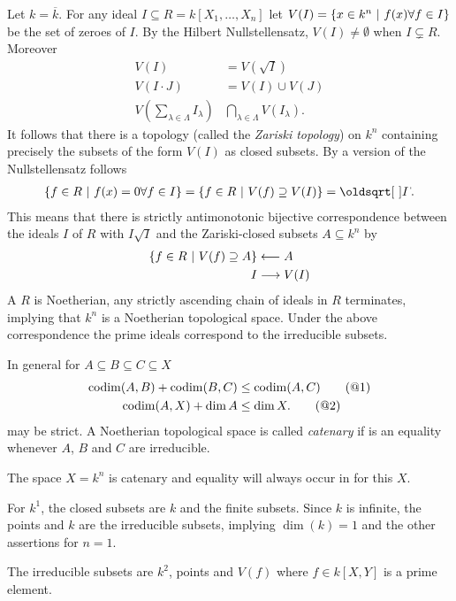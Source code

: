 \documentclass[a4paper,parskip=full,numbers=enddot]{scrreprt}
\begin{document}
\begin{example}
  Let $k =\overline{k}$. For any ideal $I\subseteq R = k[X_1,\ldots,X_n]$ let $V(I) = \left\{x\in k^n\ \middle|\  f(x) \forall f\in I\right\}$ be the set of zeroes of $I$. By the Hilbert Nullstellensatz, $V(I) \neq \emptyset$ when $I\subsetneq R$. Moreover 
  \begin{align*}
    V(I)& = V(\sqrt{I})\\
    V(I\cdot J ) &= V(I) \cup V(J)\\
    V\left(\sum_{\lambda\in\Lambda} I_\lambda\right) &\bigcap_{\lambda\in\Lambda} V(I_\lambda).
 \end{align*}
 It follows that there is a topology (called the \emph{Zariski topology}) on $k^n$ containing precisely the subsets of the form $V(I)$ as closed subsets. By a version of the Nullstellensatz follows
 \begin{align*}
  \left\{f\in R\st f(x) = 0\forall f\in I\right\} = \left\{f\in R\st V(f)\supseteq V(I)\right\} = \sqrt{I}.
 \end{align*}
 This means that there is strictly antimonotonic bijective correspondence between the ideals $I$ of $R$ with $I\sqrt{I}$ and the Zariski-closed subsets $A\subseteq k^n$ by
 \begin{align*}
    \left\{f\in R\ \middle|\  V(f)\supseteq A\right\} &\longleftarrow A\\
    I&\longrightarrow V(I)
 \end{align*}
 A $R$ is Noetherian, any strictly ascending chain of ideals in $R$ terminates, implying that $k^n$ is a Noetherian topological space. Under the above correspondence the prime ideals correspond to the irreducible subsets.  
\end{example}
\begin{rem}
 In general for $A\subseteq B\subseteq C\subseteq X$
 \begin{align*}\lbl{eq:codimIneq}
    \codim(A,B) +\codim(B,C) &\leq \codim(A,C) \tag{@1}\\ 
    \codim(A,X)+\dim A &\leq \dim X.\lbl{eq:codimIneq2}\tag{@2}
 \end{align*}
 may be strict. A Noetherian topological space is called \emph{catenary} if  is an equality whenever $A$, $B$ and $C$ are irreducible.

\end{rem}
\begin{thm}
 The space $X=k^n$ is catenary and equality will always occur in  for this $X$.
\end{thm}
\begin{example}
 For $k^1$, the closed subsets are $k$ and the finite subsets. Since $k$ is infinite, the points and $k$ are the irreducible subsets, implying $\dim(k) = 1 $ and the other assertions for $n=1$.
\end{example}
\begin{example}
 The irreducible subsets are $k^2$, points and $V(f)$ where $f\in k[X,Y]$ is a prime element.
\end{example}
\end{document}
